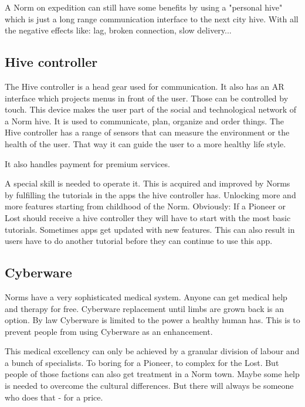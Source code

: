 A Norm on expedition can still have some benefits by using a "personal hive" which is just a long range communication interface to the next city hive. With all the negative effects like: lag, broken connection, slow delivery...

\subsection{Hive controller}
\label{sec:Hive controller}

The Hive controller is a head gear used for communication. It also has an AR interface which projects menus in front of the user. Those can be controlled by touch. This device makes the user part of the social and technological network of a Norm hive.
It is used to communicate, plan, organize and order things.
The Hive controller has a range of sensors that can measure the environment or the health of the user. That way it can guide the user to a more healthy life style.

It also handles payment for premium services.

A special skill is needed to operate it. This is acquired and improved by Norms by fulfilling the tutorials in the apps the hive controller has. Unlocking more and more features starting from childhood of the Norm. Obviously: If a Pioneer or Lost should receive a hive controller they will have to start with the most basic tutorials.
Sometimes apps get updated with new features. This can also result in users have to do another tutorial before they can continue to use this app.

\subsection{Cyberware}
\label{sec:Cyberware Norm}

Norms have a very sophisticated medical system. Anyone can get medical help and therapy for free. Cyberware replacement until limbs are grown back is an option.
By law Cyberware is limited to the power a healthy human has. This is to prevent people from using Cyberware as an enhancement.

This medical excellency can only be achieved by a granular division of labour and a bunch of specialists.
To boring for a Pioneer, to complex for the Lost. But people of those factions can also get treatment in a Norm town. Maybe some help is needed to overcome the cultural differences. But there will always be someone who does that - for a price.

